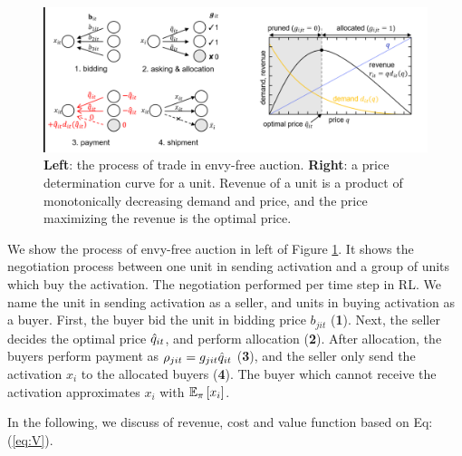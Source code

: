 \begin{figure}[t]
\centering
\includegraphics[width=\linewidth]{img/double.eps}
\caption{
\textbf{Left}: the process of trade in envy-free auction.
\textbf{Right}: a price determination curve for a unit. Revenue of a unit is a product of monotonically decreasing demand and price, and the price maximizing the revenue is the optimal price.
}
\label{fig:double}
\end{figure}

We show the process of envy-free auction in left of Figure \ref{fig:double}.
It shows the negotiation process between one unit in sending activation and a group of units which buy the activation.
The negotiation performed per time step in RL.
We name the unit in sending activation as a seller, and units in buying activation as a buyer.
First, the buyer bid the unit in bidding price $b_{jit}$ (\textbf{1}).
Next, the seller decides the optimal price ${\hat{q}}_{it}$, and perform allocation (\textbf{2}).
After allocation, the buyers perform payment as $\rho_{jit} = g_{jit} {\hat{q}}_{it}$ (\textbf{3}), and
the seller only send the activation $x_i$ to the allocated buyers (\textbf{4}).
The buyer which cannot receive the activation approximates $x_i$ with $\mathbb{E}_{\pi}\left[ x_i \right]$.

In the following, we discuss of revenue, cost and value function based on Eq:(\ref{eq:V}).




